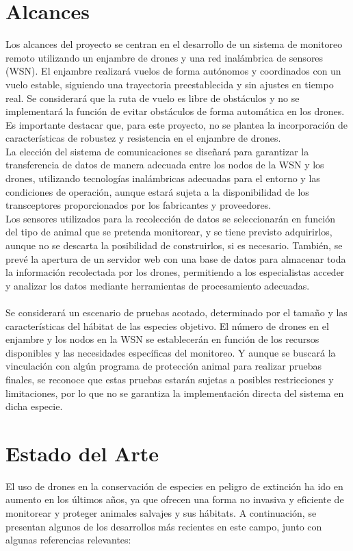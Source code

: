 \chapter{Alcances}

Los alcances del proyecto se centran en el desarrollo de un sistema de monitoreo remoto utilizando un enjambre de drones y una red inalámbrica de sensores (WSN). El enjambre realizará vuelos de forma autónomos y coordinados con un vuelo estable, siguiendo una trayectoria preestablecida y sin ajustes en tiempo real. Se considerará que la ruta de vuelo es libre de obstáculos y no se implementará la función de evitar obstáculos de forma automática en los drones. Es importante destacar que, para este proyecto, no se plantea la incorporación de características de robustez y resistencia en el enjambre de drones.\\
La elección del sistema de comunicaciones se diseñará para garantizar la transferencia de datos de manera adecuada entre los nodos de la WSN y los drones, utilizando tecnologías inalámbricas adecuadas para el entorno y las condiciones de operación, aunque estará sujeta a la disponibilidad de los transceptores proporcionados por los fabricantes y proveedores.\\
Los sensores utilizados para la recolección de datos se seleccionarán en función del tipo de animal que se pretenda monitorear, y se tiene previsto adquirirlos, aunque no se descarta la posibilidad de construirlos, si es necesario. También, se prevé la apertura de un servidor web con una base de datos para almacenar toda la información recolectada por los drones, permitiendo a los especialistas acceder y analizar los datos mediante herramientas de procesamiento adecuadas.\\ \\
Se considerará un escenario de pruebas acotado, determinado por el tamaño y las características del hábitat de las especies objetivo. El número de drones en el enjambre y los nodos en la WSN se establecerán en función de los recursos disponibles y las necesidades específicas del monitoreo. Y aunque se buscará la vinculación con algún programa de protección animal para realizar pruebas finales, se reconoce que estas pruebas estarán sujetas a posibles restricciones y limitaciones, por lo que no se garantiza la implementación directa del sistema en dicha especie.

\chapter{Estado del Arte}
El uso de drones en la conservación de especies en peligro de extinción ha ido en aumento en los últimos años, ya que ofrecen una forma no invasiva y eficiente de monitorear y proteger animales salvajes y sus hábitats. A continuación, se presentan algunos de los desarrollos más recientes en este campo, junto con algunas referencias relevantes:

